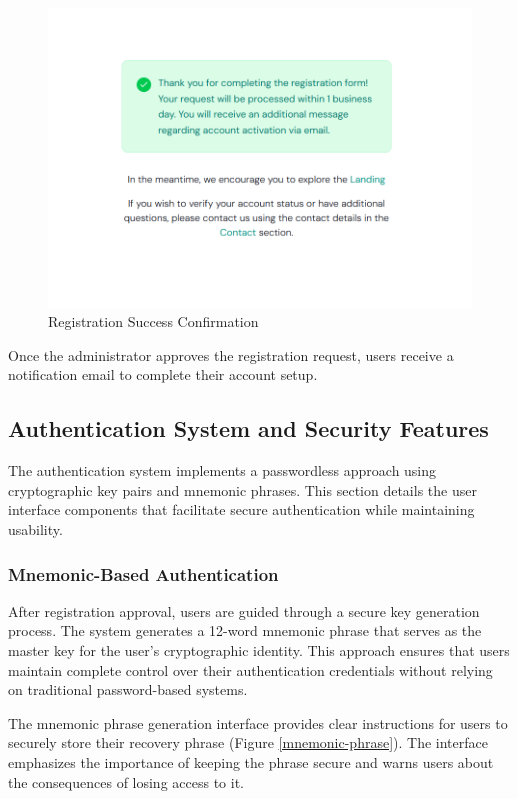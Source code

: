 \begin{figure}[H]
    \centering
    \includegraphics[width=18cm]{"images/siteUI/thankYou.png"}
    \caption{Registration Success Confirmation}
    \label{registration-success}
\end{figure}

Once the administrator approves the registration request, users receive a notification email to complete their account setup.

\subsection{Authentication System and Security Features}
The authentication system implements a passwordless approach using cryptographic key pairs and mnemonic phrases. This section details the user interface components that facilitate secure authentication while maintaining usability.

\subsubsection{Mnemonic-Based Authentication}
After registration approval, users are guided through a secure key generation process. The system generates a 12-word mnemonic phrase that serves as the master key for the user's cryptographic identity. This approach ensures that users maintain complete control over their authentication credentials without relying on traditional password-based systems.

The mnemonic phrase generation interface provides clear instructions for users to securely store their recovery phrase (Figure \ref{mnemonic-phrase}). The interface emphasizes the importance of keeping the phrase secure and warns users about the consequences of losing access to it.

